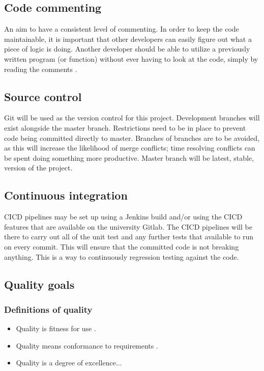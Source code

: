 \subsection{Code commenting}
An aim to have a consistent level of commenting. In order to keep the code maintainable, it is
important that other developers can easily figure out what a piece of logic is doing. Another developer should be
able to utilize a previously written program (or function) without ever having to look at the code, simply
by reading the comments \cite{germain2010commenting}.

\subsection{Source control}
Git will be used as the version control for this project. Development branches will exist alongside the
master branch. Restrictions need to be in place to prevent code being committed directly to master.
Branches of branches are to be avoided, as this will increase the likelihood of merge conflicts; time
resolving conflicts can be spent doing something more productive. Master branch will be latest,
stable, version of the project.


\subsection{Continuous integration}
CICD pipelines may be set up using a Jenkins build and/or using the CICD features that are available on
the university Gitlab. The CICD pipelines will be there to carry out all of the unit test and any further
tests that available to run on every commit. This will ensure that the committed code is not breaking
anything. This is a way to continuously regression testing against the code.


\subsection{Quality goals}

\subsubsection{Definitions of quality}
\begin{itemize}
    \tightlist
    \item Quality is fitness for use \cite{asq2005qualityglossary}.
    \item Quality means conformance to requirements \cite{morgan1994total}.
    \item Quality is a degree of excellence...\cite{merriam2007qualitydefinition}
\end{itemize}

